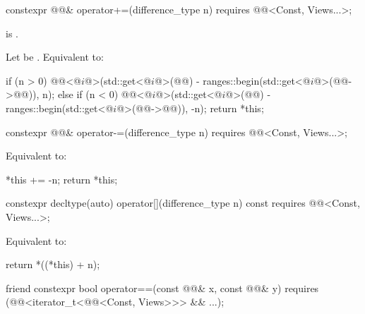 %
\begin{itemdecl}
constexpr @@& operator+=(difference_type n)
  requires @@<Const, Views...>;
\end{itemdecl}

\begin{itemdescr}
\pnum
\expects
{} is .

\pnum
\effects
Let  be .
Equivalent to:
\begin{codeblock}
if (n > 0) {
  @@<@$i$@>(std::get<@$i$@>(@@) - ranges::begin(std::get<@$i$@>(@@->@@)), n);
} else if (n < 0) {
  @@<@$i$@>(std::get<@$i$@>(@@) - ranges::begin(std::get<@$i$@>(@@->@@)), -n);
}
return *this;
\end{codeblock}
\end{itemdescr}

%
\begin{itemdecl}
constexpr @@& operator-=(difference_type n)
  requires @@<Const, Views...>;
\end{itemdecl}

\begin{itemdescr}
\pnum
\effects
Equivalent to:
\begin{codeblock}
*this += -n;
return *this;
\end{codeblock}
\end{itemdescr}

%
\begin{itemdecl}
constexpr decltype(auto) operator[](difference_type n) const
  requires @@<Const, Views...>;
\end{itemdecl}

\begin{itemdescr}
\pnum
\effects
Equivalent to:
\begin{codeblock}
return *((*this) + n);
\end{codeblock}
\end{itemdescr}

%
\begin{itemdecl}
friend constexpr bool operator==(const @@& x, const @@& y)
  requires (@@<iterator_t<@@<Const, Views>>> && ...);
\end{itemdecl}

